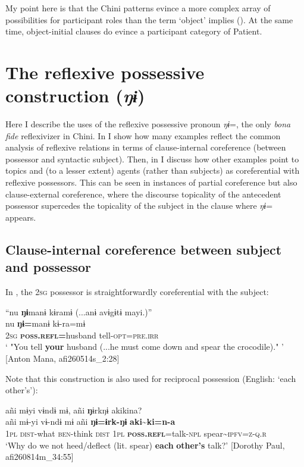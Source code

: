 \documentclass[output=paper]{langscibook}
\begin{document}
My point here is that the Chini patterns evince a more complex array of possibilities for participant roles than the term ‘object’ implies (\citealt{MithunChafe1999}). At the same time, object-initial clauses do evince a participant category of Patient.

\section{{The} {reflexive} {possessive} {construction} {(\textit{ŋɨ}})}\label{sec:brooks:3}

Here I describe the uses of the reflexive possessive pronoun \textit{ŋɨ}=, the only \textit{bona fide} reflexivizer in Chini. In  I show how many examples reflect the common analysis of reflexive relations in terms of clause-internal coreference (between possessor and syntactic subject). Then, in  I discuss how other examples point to topics and (to a lesser extent) agents (rather than subjects) as coreferential with reflexive possessors. This can be seen in instances of partial coreference but also clause-external coreference, where the discourse topicality of the antecedent possessor supercedes the topicality of the subject in the clause where \textit{ŋɨ}= appears.

\subsection{{Clause-internal} {coreference} {between} {subject} {and} {possessor}}\label{sec:brooks:3.1}

In , the 2\textsc{sg} possessor is straightforwardly coreferential with the subject:%

\ea\label{ex:brooks:11}
\glll “nu \textbf{ŋɨ}manɨ kɨramɨ   {(...anɨ avɨgɨtɨ mayi.)”}\\
nu \textbf{ŋɨ=}manɨ  kɨ-ra=mɨ { } \\
\textsc{2sg}  \textbf{\textsc{poss.refl}}\textbf{=}husband   tell-\textsc{opt=pre.irr} { } \\
 \glt ` "You tell \textbf{your} husband (...he must come down and spear the crocodile)." '
 [Anton Mana, afi260514s\_2:28]
\z


Note that this construction is also used for reciprocal possession (English: ‘each other’s’):

\ea\label{ex:brooks:12}
\glll añi mɨyi  vɨndɨ   mɨ,  añi  \textbf{ŋ}ɨrkŋɨ akikina?\\
    añi mɨ-yi  vɨ-ndɨ  mɨ   añi \textbf{ŋɨ=ɨrk-ŋɨ}  \textbf{aki{\textasciitilde}ki=n-a}\\
 \textsc{1pl} \textsc{dist-}what \textsc{ben}-think  \textsc{dist} \textsc{1pl}  \textbf{\textsc{poss.refl}}=talk-\textsc{npl}  spear\textsc{{\textasciitilde}ipfv=z-q.r}\\
 \glt `Why do we not heed/deflect (lit. spear) \textbf{each} \textbf{other's} talk?'
 [Dorothy Paul, afi260814m\_34:55]
\z
\end{document}
